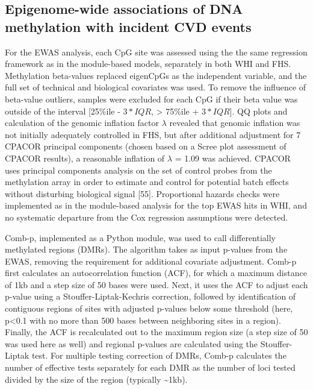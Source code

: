 \documentclass[]{article}
\theoremstyle{definition}
\theoremstyle{definition}
\theoremstyle{definition}
\theoremstyle{remark}
\begin{document}
\subsection{Epigenome-wide associations of DNA methylation with incident
CVD
events}\label{epigenome-wide-associations-of-dna-methylation-with-incident-cvd-events}

For the EWAS analysis, each CpG site was assessed using the the same
regression framework as in the module-based models, separately in both
WHI and FHS. Methylation beta-values replaced eigenCpGs as the
independent variable, and the full set of technical and biological
covariates was used. To remove the influence of beta-value outliers,
samples were excluded for each CpG if their beta value was outside of
the interval {[}25\%ile - \(3*IQR\), \textgreater{} 75\%ile +
\(3*IQR\){]}. QQ plots and calculation of the genomic inflation factor
\(\lambda\) revealed that genomic inflation was not initially adequately
controlled in FHS, but after additional adjustment for 7 CPACOR
principal components (chosen based on a Scree plot assessment of CPACOR
results), a reasonable inflation of \(\lambda\) = 1.09 was achieved.
CPACOR uses principal components analysis on the set of control probes
from the methylation array in order to estimate and control for
potential batch effects without disturbing biological signal {[}55{]}.
Proportional hazards checks were implemented as in the module-based
analysis for the top EWAS hits in WHI, and no systematic departure from
the Cox regression assumptions were detected.

Comb-p, implemented as a Python module, was used to call differentially
methylated regions (DMRs). The algorithm takes as input p-values from
the EWAS, removing the requirement for additional covariate adjustment.
Comb-p first calculates an autocorrelation function (ACF), for which a
maximum distance of 1kb and a step size of 50 bases were used. Next, it
uses the ACF to adjust each p-value using a Stouffer-Liptak-Kechris
correction, followed by identification of contiguous regions of sites
with adjusted p-values below some threshold (here, p\textless{}0.1 with
no more than 500 bases between neighboring sites in a region). Finally,
the ACF is recalculated out to the maximum region size (a step size of
50 was used here as well) and regional p-values are calculated using the
Stouffer-Liptak test. For multiple testing correction of DMRs, Comb-p
calculates the number of effective tests separately for each DMR as the
number of loci tested divided by the size of the region (typically
\textasciitilde{}1kb).
\end{document}
